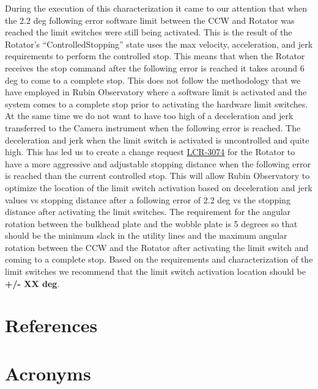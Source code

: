 \documentclass[SE,lsstdraft,authoryear,toc]{lsstdoc}
\begin{document}
During the execution of this characterization it came to our attention that when the 2.2 deg following error software limit between the CCW and Rotator was reached the limit switches were still being activated. This is the result of the Rotator’s “ControlledStopping” state uses the max velocity, acceleration, and jerk requirements to perform the controlled stop. This means that when the Rotator receives the stop command after the following error is reached it takes around 6 deg to come to a complete stop. This does not follow the methodology that we have employed in Rubin Observatory where a software limit is activated and the system comes to a complete stop prior to activating the hardware limit switches. At the same time we do not want to have too high of a deceleration and jerk transferred to the Camera instrument when the following error is reached. The deceleration and jerk when the limit switch is activated is uncontrolled and quite high. This has led us to create a change request \href{https://project.lsst.org/groups/ccb/node/5015}{LCR-3074} for the Rotator to have a more aggressive and adjustable stopping distance when the following error is reached than the current controlled stop. This will allow Rubin Observatory to optimize the location of the limit switch activation based on deceleration and jerk values vs stopping distance after a following error of 2.2 deg vs the stopping distance after activating the limit switches. The  requirement for the angular rotation between the bulkhead plate and the wobble plate is 5 degrees so that should be the minimum slack in the utility lines and the maximum angular rotation between the CCW and the Rotator after activating the limit switch and coming to a complete stop.
Based on the requirements and characterization of the limit switches we recommend that the limit switch activation location should be {\color{red} \textbf{+/- XX deg}}.
\newpage

\appendix
\section{References} \label{sec:bib}
\renewcommand{\refname}{} %


\section{Acronyms} \label{sec:acronyms}

\end{document}
